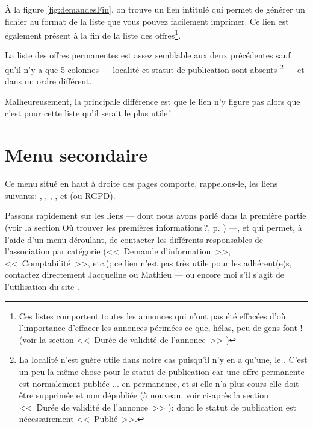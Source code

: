 À la figure \ref{fig:demandesFin}, on trouve un lien intitulé  qui permet de générer un fichier au format  de la liste que vous pouvez facilement imprimer. Ce lien est également présent à la fin de la liste des offres\footnote{Ces listes comportent toutes les annonces qui n'ont pas été effacées d'où l'importance d'effacer les annonces périmées ce que, hélas, peu de gens font ! (voir la section <<~Durée de validité de l'annonce~>> )}.


La liste des offres permanentes est assez semblable aux deux précédentes sauf qu’il n’y a que 5 colonnes --- localité et statut de publication sont absents%
\footnote{La localité n'est guère utile dans notre cas puisqu'il n'y en a qu'une, le \CdS. C'est un peu la même chose pour le statut de publication car une offre permanente est normalement publiée ... en permanence, et si elle n'a plus cours elle doit être supprimée et non dépubliée (à nouveau, voir ci-après la section <<~Durée de validité de l'annonce~>> ): donc le statut de publication est nécessairement <<~Publié~>>.}
--- et dans un ordre  différent.

Malheureusement, la principale différence est que le lien  n'y figure pas alors que c’est pour cette liste qu’il serait le plus utile\,!

\section{Menu secondaire}

Ce menu situé en haut à droite des pages comporte, rappelons-le, les liens suivants: , , , , et  (ou RGPD).

Passons rapidement sur les liens  --- dont nous avons parlé dans la première partie (voir la section \og{}Où trouver les premières informations\,?\fg, p. \pageref{page:premieresInfos}) ---, et  qui permet, à l'aide d'un menu déroulant, de contacter les différents responsables de l'association par catégorie (<<~Demande d'information~>>, <<~Comptabilité~>>, etc.); ce lien n’est pas très utile pour les adhérent(e)s, contactez directement Jacqueline ou Mathieu
 --- ou encore moi s'il s'agit de l'utilisation du site \CF.

